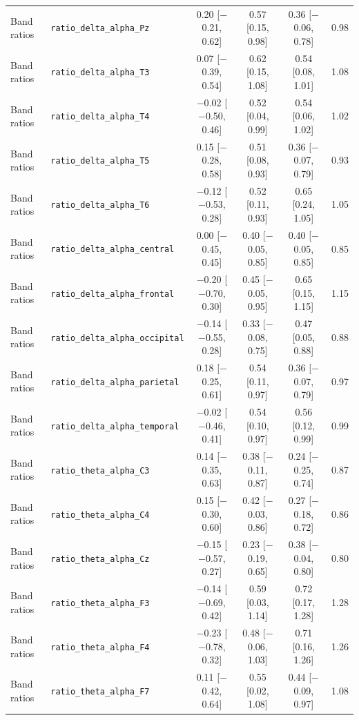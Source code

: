 {\begin{longtable}{llcccc}
Band ratios & \texttt{ratio\_delta\_alpha\_Pz} & 0.20 [$-$0.21, 0.62] & 0.57 [0.15, 0.98] & 0.36 [$-$0.06, 0.78] & 0.98 \\
Band ratios & \texttt{ratio\_delta\_alpha\_T3} & 0.07 [$-$0.39, 0.54] & 0.62 [0.15, 1.08] & 0.54 [0.08, 1.01] & 1.08 \\
Band ratios & \texttt{ratio\_delta\_alpha\_T4} & $-$0.02 [$-$0.50, 0.46] & 0.52 [0.04, 0.99] & 0.54 [0.06, 1.02] & 1.02 \\
Band ratios & \texttt{ratio\_delta\_alpha\_T5} & 0.15 [$-$0.28, 0.58] & 0.51 [0.08, 0.93] & 0.36 [$-$0.07, 0.79] & 0.93 \\
Band ratios & \texttt{ratio\_delta\_alpha\_T6} & $-$0.12 [$-$0.53, 0.28] & 0.52 [0.11, 0.93] & 0.65 [0.24, 1.05] & 1.05 \\
Band ratios & \texttt{ratio\_delta\_alpha\_central} & 0.00 [$-$0.45, 0.45] & 0.40 [$-$0.05, 0.85] & 0.40 [$-$0.05, 0.85] & 0.85 \\
Band ratios & \texttt{ratio\_delta\_alpha\_frontal} & $-$0.20 [$-$0.70, 0.30] & 0.45 [$-$0.05, 0.95] & 0.65 [0.15, 1.15] & 1.15 \\
Band ratios & \texttt{ratio\_delta\_alpha\_occipital} & $-$0.14 [$-$0.55, 0.28] & 0.33 [$-$0.08, 0.75] & 0.47 [0.05, 0.88] & 0.88 \\
Band ratios & \texttt{ratio\_delta\_alpha\_parietal} & 0.18 [$-$0.25, 0.61] & 0.54 [0.11, 0.97] & 0.36 [$-$0.07, 0.79] & 0.97 \\
Band ratios & \texttt{ratio\_delta\_alpha\_temporal} & $-$0.02 [$-$0.46, 0.41] & 0.54 [0.10, 0.97] & 0.56 [0.12, 0.99] & 0.99 \\
Band ratios & \texttt{ratio\_theta\_alpha\_C3} & 0.14 [$-$0.35, 0.63] & 0.38 [$-$0.11, 0.87] & 0.24 [$-$0.25, 0.74] & 0.87 \\
Band ratios & \texttt{ratio\_theta\_alpha\_C4} & 0.15 [$-$0.30, 0.60] & 0.42 [$-$0.03, 0.86] & 0.27 [$-$0.18, 0.72] & 0.86 \\
Band ratios & \texttt{ratio\_theta\_alpha\_Cz} & $-$0.15 [$-$0.57, 0.27] & 0.23 [$-$0.19, 0.65] & 0.38 [$-$0.04, 0.80] & 0.80 \\
Band ratios & \texttt{ratio\_theta\_alpha\_F3} & $-$0.14 [$-$0.69, 0.42] & 0.59 [0.03, 1.14] & 0.72 [0.17, 1.28] & 1.28 \\
Band ratios & \texttt{ratio\_theta\_alpha\_F4} & $-$0.23 [$-$0.78, 0.32] & 0.48 [$-$0.06, 1.03] & 0.71 [0.16, 1.26] & 1.26 \\
Band ratios & \texttt{ratio\_theta\_alpha\_F7} & 0.11 [$-$0.42, 0.64] & 0.55 [0.02, 1.08] & 0.44 [$-$0.09, 0.97] & 1.08 \\

\end{longtable}}
